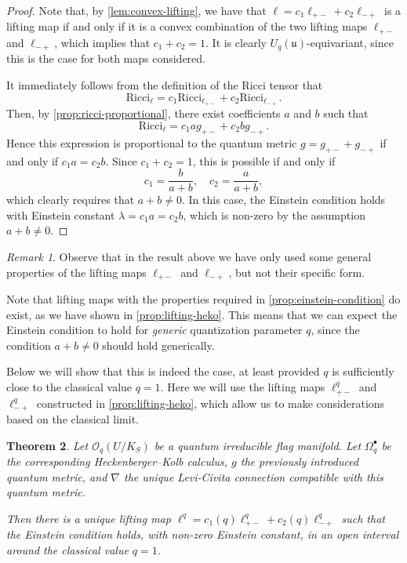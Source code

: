 \documentclass[a4paper,12pt,reqno,english]{amsart}
\numberwithin{equation}{section}
\numberwithin{figure}{section}
\theoremstyle{plain}
\newtheorem{theorem}{Theorem}[section]
\theoremstyle{plain}
\theoremstyle{plain}
\theoremstyle{plain}
\theoremstyle{plain}
\theoremstyle{definition}
\theoremstyle{definition}
\theoremstyle{definition}
\theoremstyle{remark}
\newtheorem{remark}[theorem]{Remark}
\theoremstyle{definition}
\newcommand{\Uqu}{U_q(\mathfrak{u})}
\newcommand{\Oqflag}{\mathcal{O}_q(U / K_S)}
\newcommand{\Ricci}{\mathrm{Ricci}}
\newcommand{\liftmap}{\ell}
\newcommand{\liftqpm}{\ell^q_{+ -}}
\newcommand{\liftqmp}{\ell^q_{- +}}
\newcommand{\diffcalc}{\Omega_q}
\begin{document}
\begin{proof}
Note that, by \cref{lem:convex-lifting}, we have that $\liftmap = c_1 \liftmap_{+ -} + c_2 \liftmap_{- +}$ is a lifting map if and only if it is a convex combination of the two lifting maps $\liftmap_{+ -}$ and $\liftmap_{- +}$, which implies that $c_1 + c_2 = 1$.
It is clearly $\Uqu$-equivariant, since this is the case for both maps considered.

It immediately follows from the definition of the Ricci tensor that
\[
\Ricci_\ell = c_1 \Ricci_{\ell_{+ -}} + c_2 \Ricci_{\ell_{- +}}.
\]
Then, by \cref{prop:ricci-proportional}, there exist coefficients $a$ and $b$ such that
\[
\Ricci_\ell = c_1 a g_{+ -} + c_2 b g_{- +}.
\]
Hence this expression is proportional to the quantum metric $g = g_{+ -} + g_{- +}$ if and only if $c_1 a = c_2 b$.
Since $c_1 + c_2 = 1$, this is possible if and only if
\[
c_1 = \frac{b}{a + b}, \quad
c_2 = \frac{a}{a + b},
\]
which clearly requires that $a + b \neq 0$.
In this case, the Einstein condition holds with Einstein constant $\lambda = c_1 a = c_2 b$, which is non-zero by the assumption $a + b \neq 0$.
\end{proof}

\begin{remark}
Observe that in the result above we have only used some general properties of the lifting maps $\liftmap_{+ -}$ and $\liftmap_{- +}$, but not their specific form.
\end{remark}

Note that lifting maps with the properties required in \cref{prop:einstein-condition} do exist, as we have shown in \cref{prop:lifting-heko}.
This means that we can expect the Einstein condition to hold for \emph{generic} quantization parameter $q$, since the condition $a + b \neq 0$ should hold generically.

Below we will show that this is indeed the case, at least provided $q$ is sufficiently close to the classical value $q = 1$.
Here we will use the lifting maps $\liftqpm$ and $\liftqmp$ constructed in \cref{prop:lifting-heko}, which allow us to make considerations based on the classical limit.

\begin{theorem}
\label{thm:einstein-condition}
Let $\Oqflag$ be a quantum irreducible flag manifold.
Let $\diffcalc^\bullet$ be the corresponding Heckenberger--Kolb calculus, $g$ the previously introduced quantum metric, and $\nabla$ the unique Levi-Civita connection compatible with this quantum metric.

Then there is a unique lifting map $\liftmap^q = c_1(q) \liftqpm + c_2(q) \liftqmp$ such that the Einstein condition holds, with non-zero Einstein constant, in an open interval around the classical value $q = 1$.
\end{theorem}
\end{document}
